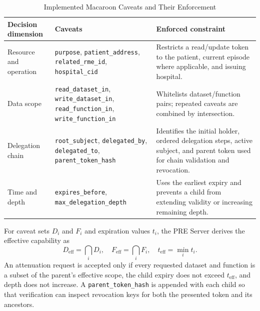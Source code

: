 \documentclass[conference,a4paper,english]{IEEEtran}
\begin{document}
\begin{table}[t]
	\caption{Implemented Macaroon Caveats and Their Enforcement}
	\label{tab:caveats}
	\centering
	\small
	\setlength{\tabcolsep}{4pt}
	\begin{tabular}{@{}p{}p{}p{}@{}}
		\toprule
		\textbf{Decision dimension}                                                                                        & \textbf{Caveats} & \textbf{Enforced constraint} \\
		\midrule
		Resource and operation                                                                                             &
		\texttt{purpose}, \texttt{patient\_address}, \texttt{related\_rme\_id}, \texttt{hospital\_cid}                     &
		Restricts a read/update token to the patient, current episode where applicable, and issuing hospital.                                                                \\
		Data scope                                                                                                         &
		\texttt{read\_dataset\_in}, \texttt{write\_dataset\_in}, \texttt{read\_function\_in}, \texttt{write\_function\_in} &
		Whitelists dataset/function pairs; repeated caveats are combined by intersection.                                                                                    \\
		Delegation chain                                                                                                   &
		\texttt{root\_subject}, \texttt{delegated\_by}, \texttt{delegated\_to}, \texttt{parent\_token\_hash}               &
		Identifies the initial holder, ordered delegation steps, active subject, and parent token used for chain validation and revocation.                                  \\
		Time and depth                                                                                                     &
		\texttt{expires\_before}, \texttt{max\_delegation\_depth}                                                          &
		Uses the earliest expiry and prevents a child from extending validity or increasing remaining depth.                                                                 \\
		\bottomrule
	\end{tabular}
\end{table}

For caveat sets $D_i$ and $F_i$ and expiration values $t_i$, the PRE Server derives the effective capability as
\begin{equation}
	D_{\mathrm{eff}}=\bigcap_i D_i,\quad
	F_{\mathrm{eff}}=\bigcap_i F_i,\quad
	t_{\mathrm{eff}}=\min_i t_i .
	\label{eq:effective-capability}
\end{equation}
An attenuation request is accepted only if every requested dataset and function is a subset of the parent's effective scope, the child expiry does not exceed $t_{\mathrm{eff}}$, and depth does not increase. A \texttt{parent\_token\_hash} is appended with each child so that verification can inspect revocation keys for both the presented token and its ancestors.
\end{document}
